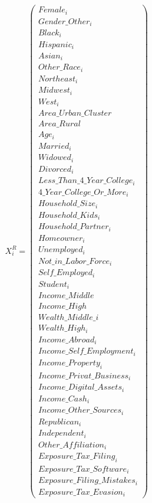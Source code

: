\documentclass[11pt]{article}
\begin{document}
\begin{center}
{\[\begin{array}{ccc}
& \qquad\qquad &
X_i^{R} =
\left(
\begin{array}{c}
Female_i \\ Gender\_Other_i \\[0.2em]
Black_i \\ Hispanic_i \\ Asian_i \\ Other\_Race_i \\[0.2em]
Northeast_i \\ Midwest_i \\ West_i \\[0.2em]
Area\_Urban\_Cluster \\ Area\_Rural \\[0.2em]
Age_i \\[0.2em]
Married_i \\ Widowed_i \\ Divorced_i \\[0.2em]
Less\_Than\_4\_Year\_College_i \\ 4\_Year\_College\_Or\_More_i \\[0.2em]
Household\_Size_i \\ Household\_Kids_i \\ Household\_Partner_i \\[0.2em]
Homeowner_i \\
Unemployed_i \\ Not\_in\_Labor\_Force_i \\ Self\_Employed_i \\[0.2em]
Student_i \\[0.2em]
Income\_Middle \\ Income\_High \\[0.2em]
Wealth\_Middle\_i \\ Wealth\_High_i \\[0.2em]
Income\_Abroad_i \\ Income\_Self\_Employment_i \\ Income\_Property_i \\ Income\_Privat\_Business_i \\ Income\_Digital\_Assets_i \\ Income\_Cash_i \\ Income\_Other\_Sources_i \\[0.2em]
Republican_i \\ Independent_i \\ Other\_Affiliation_i \\[0.2em]
Exposure\_Tax\_Filing_i \\ Exposure\_Tax\_Software_i \\ Exposure\_Filing\_Mistakes_i \\ Exposure\_Tax\_Evasion_i
\end{array}
\right)


\end{array}\]}
\end{center}
\end{document}
